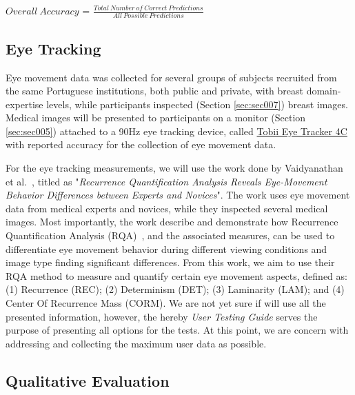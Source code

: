 \hfill

\begin{Form}
\Large
\begin{center}
$Overall~Accuracy$ = $\frac{Total~Number~of~Correct~Predictions}{All~Possible~Predictions}$
\end{center}
\end{Form}

\hfill

\subsection{Eye Tracking}

Eye movement data was collected for several groups of subjects recruited from the same Portuguese institutions, both public and private, with breast domain-expertise levels, while participants inspected (Section \ref{sec:sec007}) breast images. Medical images will be presented to participants on a monitor (Section \ref{sec:sec005}) attached to a 90Hz eye tracking device, called \hyperlink{https://gaming.tobii.com/product/tobii-eye-tracker-4c/}{Tobii Eye Tracker 4C} with reported accuracy for the collection of eye movement data.

For the eye tracking measurements, we will use the work done by Vaidyanathan et al.~\cite{vaidyanathan2014recurrence}, titled as "{\it Recurrence Quantification Analysis Reveals Eye-Movement Behavior Differences between Experts and Novices}". The work uses eye movement data from medical experts and novices, while they inspected several medical images. Most importantly, the work describe and demonstrate how Recurrence Quantification Analysis (RQA)~\cite{anderson2013recurrence}, and the associated measures, can be used to differentiate eye movement behavior during different viewing conditions and image type finding significant differences. From this work, we aim to use their RQA method to measure and quantify certain eye movement aspects, defined as: (1) Recurrence (REC); (2) Determinism (DET); (3) Laminarity (LAM); and (4) Center Of Recurrence Mass (CORM). We are not yet sure if will use all the presented information, however, the hereby {\it User Testing Guide} serves the purpose of presenting all options for the tests. At this point, we are concern with addressing and collecting the maximum user data as possible.

\subsection{Qualitative Evaluation}

